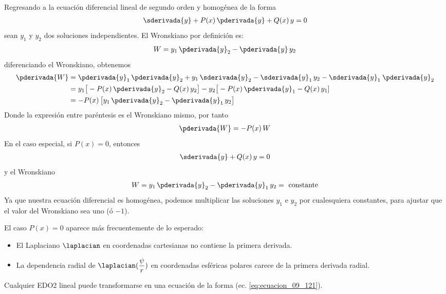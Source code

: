 Regresando a la ecuación diferencial lineal de segundo orden y homogénea de la forma
\begin{align}
\sderivada{y} + P (x) \, \pderivada{y} + Q (x) \, y = 0
\label{eq:ecuacion_09_118}
\end{align}
sean $y_{1}$ y $y_{2}$ dos soluciones independientes. El Wronskiano por definición es:
\begin{align}
W = y_{1} \, \pderivada{y}_{2} - \pderivada{y} \, y_{2}
\label{eq:ecuacion_09_119}
\end{align}
diferenciando el Wronskiano, obtenemos
\begin{align*}
\pderivada{W} &= \pderivada{y}_{1} \, \pderivada{y}_{2} + y_{1} \, \sderivada{y}_{2} - \sderivada{y}_{1} \, y_{2} - \sderivada{y}_{1} \: \pderivada{y}_{2} \\
&= y_{1} \big[ - P (x) \, \pderivada{y}_{2} - Q (x) \, y_{2} \big] - y_{2} \big[ - P (x) \, \pderivada{y}_{1} - Q (x)  \, y_{1}] \\
&= - P (x) \, \big[ y_{1} \, \pderivada{y}_{2} - \pderivada{y}_{1} \, y_{2} \big]
\end{align*}
Donde la expresión entre paréntesis es el Wronskiano mismo, por tanto
\begin{align}
\pderivada{W} = - P (x) \, W
\label{eq:ecuacion_09_120}
\end{align}
En el caso especial, si $P (x) = 0$, entonces
\begin{align}
\sderivada{y} + Q (x) \, y = 0
\label{eq:ecuacion_09_121}
\end{align}
y el Wronskiano
\begin{align}
W = y_{1} \, \pderivada{y}_{2} - \pderivada{y}_{1} \, y_{2} = \text{ constante}
\label{eq:ecuacion_09_1202}
\end{align}
Ya que nuestra ecuación diferencial es homogénea, podemos multiplicar las soluciones $y_{1}$ e $y_{2}$ por cualesquiera constantes, para ajustar que el valor del Wronskiano sea uno (ó $-1$).
\par
El caso $P (x) = 0$ aparece más frecuentemente de lo esperado:
\begin{itemize}
\item El Laplaciano $\laplacian$ en coordenadas cartesianas no contiene la primera derivada.
\item La dependencia radial de $\laplacian (\dfrac{\psi} {r})$ en coordenadas esféricas polares carece de la primera derivada radial.
\end{itemize}
Cualquier EDO2 lineal puede transformarse en una ecuación de la forma (ec. \ref{eq:ecuacion_09_121}).
